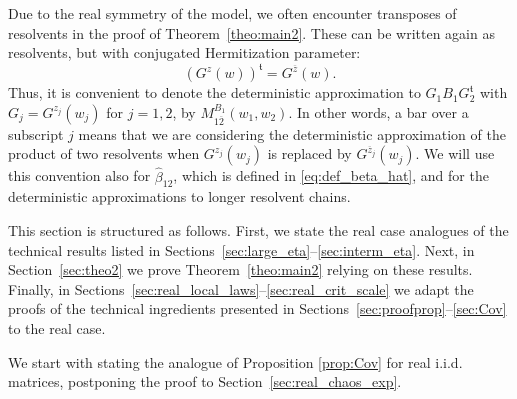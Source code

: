 \documentclass[10pt]{amsart}
\numberwithin{equation}{section}
\begin{document}
Due to the real symmetry of the model, we often encounter transposes of resolvents in the proof of Theorem~\ref{theo:main2}. These can be written again as resolvents, but with conjugated Hermitization parameter:
\begin{equation}
\left(G^z(w)\right)^\mathfrak{t} = G^{\overline{z}}(w).
\label{eq:G_symmetry}
\end{equation}
Thus, it is convenient to denote the deterministic approximation to $G_1B_1G_2^\mathfrak{t}$ with $G_j=G^{z_j}(w_j)$ for $j=1,2$, by $M_{1\overline{2}}^{B_1}(w_1,w_2)$. In other words, a bar over a subscript $j$ means that we are considering the deterministic approximation of the product of two resolvents when $G^{z_j}(w_j)$ is replaced by $G^{\overline{z}_j}(w_j)$. We will use this convention also for $\widehat{\beta}_{12}$, which is defined in \eqref{eq:def_beta_hat}, and for the deterministic approximations to longer resolvent chains.

This section is structured as follows. First, we state the real case analogues of the technical results listed in Sections~\ref{sec:large_eta}--\ref{sec:interm_eta}. Next, in Section~\ref{sec:theo2} we prove Theorem~\ref{theo:main2} relying on these results. Finally, in Sections~\ref{sec:real_local_laws}--\ref{sec:real_crit_scale} we adapt the proofs of the technical ingredients presented in Sections~\ref{sec:proofprop}--\ref{sec:Cov} to the real case.


We start with stating the analogue of Proposition \ref{prop:Cov} for real i.i.d. matrices, postponing the proof to Section~\ref{sec:real_chaos_exp}.
\end{document}
